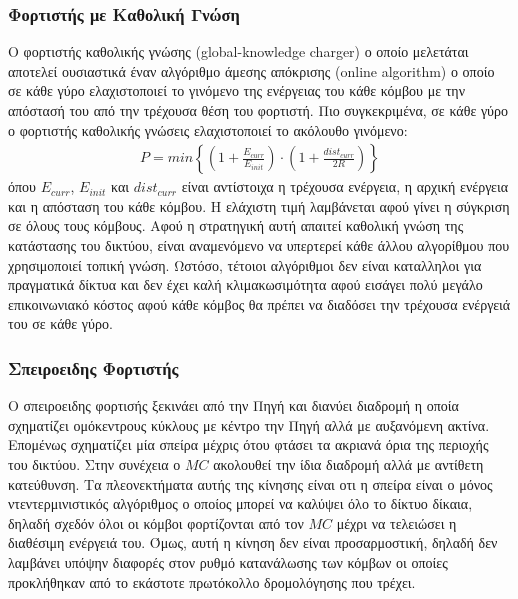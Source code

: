 \subsubsection{Φορτιστής με Καθολική Γνώση}
Ο φορτιστής καθολικής γνώσης (global-knowledge charger) ο οποίο μελετάται αποτελεί ουσιαστικά έναν αλγόριθμο άμεσης απόκρισης (online algorithm) ο οποίο σε κάθε γύρο
ελαχιστοποιεί το γινόμενο της ενέργειας του κάθε κόμβου με την απόστασή του από την τρέχουσα θέση του φορτιστή. Πιο συγκεκριμένα, σε κάθε γύρο ο φορτιστής καθολικής
γνώσεις ελαχιστοποιεί το ακόλουθο γινόμενο:
\begin{align*}
P = min\left\{ \left(1 + \frac{E_{curr}}{E_{init}}\right) \cdot \left(1  + \frac{dist_{curr}}{2R}\right) \right\}
\end{align*}
όπου $E_{curr}$, $E_{init}$  και $dist_{curr}$ είναι αντίστοιχα η τρέχουσα ενέργεια, η αρχική ενέργεια και η απόσταση του κάθε κόμβου. Η ελάχιστη τιμή λαμβάνεται
αφού γίνει η σύγκριση σε όλους τους κόμβους. Αφού η στρατηγική αυτή απαιτεί καθολική γνώση της κατάστασης του δικτύου, είναι αναμενόμενο να υπερτερεί κάθε άλλου
αλγορίθμου που χρησιμοποιεί τοπική γνώση. Ωστόσο, τέτοιοι αλγόριθμοι δεν είναι καταλληλοι για πραγματικά δίκτυα και δεν έχει καλή κλιμακωσιμότητα αφού εισάγει
πολύ μεγάλο επικοινωνιακό κόστος αφού κάθε κόμβος θα πρέπει να διαδόσει την τρέχουσα ενέργειά του σε κάθε γύρο.


\subsubsection{Σπειροειδης Φορτιστής}
Ο σπειροειδης φορτισής ξεκινάει από την Πηγή και διανύει διαδρομή η οποία σχηματίζει ομόκεντρους κύκλους με κέντρο την Πηγή αλλά με αυξανόμενη ακτίνα. Επομένως
σχηματίζει μία σπείρα μέχρις ότου φτάσει τα ακριανά όρια της περιοχής του δικτύου. Στην συνέχεια  ο $MC$ ακολουθεί την ίδια διαδρομή αλλά με αντίθετη κατεύθυνση. Τα
πλεονεκτήματα αυτής της κίνησης είναι οτι η σπείρα είναι ο μόνος ντεντερμινιστικός αλγόριθμος ο οποίος μπορεί να καλύψει όλο το δίκτυο δίκαια, δηλαδή σχεδόν όλοι οι
κόμβοι φορτίζονται από τον $MC$ μέχρι να τελειώσει η διαθέσιμη ενέργειά του. Όμως, αυτή η κίνηση δεν είναι προσαρμοστική, δηλαδή δεν  λαμβάνει υπόψην διαφορές στον
ρυθμό κατανάλωσης των κόμβων οι οποίες προκλήθηκαν από το εκάστοτε πρωτόκολλο δρομολόγησης που τρέχει.

